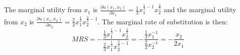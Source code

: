 \documentclass[12pt]{article}
\newcounter{question}[section]
\newenvironment{subquestions}{
  \begin{enumerate}[label=(\roman*)]}{\end{enumerate}}
\begin{document}
\begin{subquestions}
\begin{itemize}
        \textcolor{solution-color}{
          The marginal utility from $x_1$ is $\frac{\partial u\left( x_1,x_2
          \right)}{\partial x_1}=\frac{1}{3}x_1^{\frac{1}{3}-1}x_2^{\frac{2}{3}}$
          and the marginal utility from $x_2$ is $\frac{\partial u\left( x_1,x_2
          \right)}{\partial x_2}=\frac{2}{3}x_1^{\frac{1}{3}}x_2^{\frac{2}{3}-1}$.
          The marginal rate of substitution is then:
          \[
            MRS=-\frac{\frac{1}{3}x_1^{\frac{1}{3} -
            1}x_2^{\frac{2}{3}}}{\frac{2}{3}x_1^{\frac{1}{3}}x_2^{\frac{2}{3}-1}}=
            -\frac{\frac{1}{3}x_1^{-1}}{\frac{2}{3}x_2^{-1}}=-\frac{x_2}{2x_1}
          \]
        }
    \end{itemize}
\end{subquestions}
\end{document}
